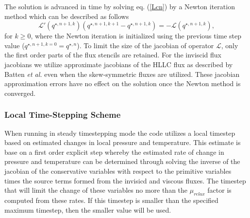 The solution is advanced in time by solving eq. (\ref{Lcn}) by a
Newton iteration method which can be described as follows
\begin{equation}
\mathcal{L}'(q^{\star, n+1,k}) (q^{\star,n+1,k+1} - q^{\star, n+1,k}) = -\mathcal{L}
(q^{\star,n+1,k}), \label{new}
\end{equation}
for $k\geq 0$, where the Newton iteration is initialized using the
previous time step value ($q^{\star,n+1,k=0} = q^{\star,n}$). To limit
the size of the jacobian of operator $\mathcal{L}$, only the first
order parts of the flux stencils are retained.  For the inviscid flux
jacobians we utilize approximate jacobians of the HLLC flux as
described by Batten {\it et al.} \cite{Batten.2006} even when the
skew-symmetric fluxes are utilized. These jacobian approximation
errors have no effect on the solution once the Newton method is
converged.


\subsubsection{Local Time-Stepping Scheme}

When running in steady timestepping mode the code utilizes a local
timestep based on estimated changes in local pressure and temperature.
This estimate is base on a first order explicit step whereby the
estimated rate of change in pressure and temperature can be determined
through solving the inverse of the jacobian of the conservative
variables with respect to the primitive variables times the source
terms formed from the invisicd and viscous fluxes.  The timestep that
will limit the change of these variables no more than the
$\mu_{relax}$ factor is computed from these rates.  If this timestep
is smaller than the specified maximum timestep, then the smaller value
will be used.
